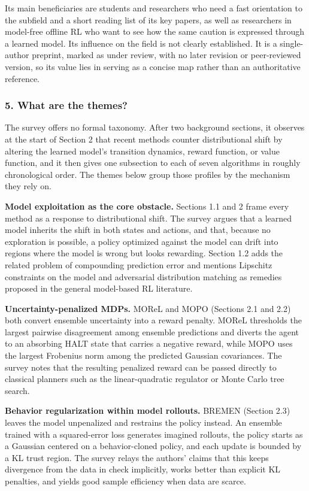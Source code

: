 \documentclass[11pt]{article}
\newcommand{\question}[1]{\subsubsection*{#1}}
\begin{document}
Its main beneficiaries are students and researchers who need a fast orientation to the subfield and a short reading list of its key papers, as well as researchers in model-free offline RL who want to see how the same caution is expressed through a learned model. Its influence on the field is not clearly established. It is a single-author preprint, marked as under review, with no later revision or peer-reviewed version, so its value lies in serving as a concise map rather than an authoritative reference.

\question{5. What are the themes?}

The survey offers no formal taxonomy. After two background sections, it observes at the start of Section 2 that recent methods counter distributional shift by altering the learned model's transition dynamics, reward function, or value function, and it then gives one subsection to each of seven algorithms in roughly chronological order. The themes below group those profiles by the mechanism they rely on.

\textbf{Model exploitation as the core obstacle.} Sections 1.1 and 2 frame every method as a response to distributional shift. The survey argues that a learned model inherits the shift in both states and actions, and that, because no exploration is possible, a policy optimized against the model can drift into regions where the model is wrong but looks rewarding. Section 1.2 adds the related problem of compounding prediction error and mentions Lipschitz constraints on the model and adversarial distribution matching as remedies proposed in the general model-based RL literature.

\textbf{Uncertainty-penalized MDPs.} MOReL and MOPO (Sections 2.1 and 2.2) both convert ensemble uncertainty into a reward penalty. MOReL thresholds the largest pairwise disagreement among ensemble predictions and diverts the agent to an absorbing HALT state that carries a negative reward, while MOPO uses the largest Frobenius norm among the predicted Gaussian covariances. The survey notes that the resulting penalized reward can be passed directly to classical planners such as the linear-quadratic regulator or Monte Carlo tree search.

\textbf{Behavior regularization within model rollouts.} BREMEN (Section 2.3) leaves the model unpenalized and restrains the policy instead. An ensemble trained with a squared-error loss generates imagined rollouts, the policy starts as a Gaussian centered on a behavior-cloned policy, and each update is bounded by a KL trust region. The survey relays the authors' claims that this keeps divergence from the data in check implicitly, works better than explicit KL penalties, and yields good sample efficiency when data are scarce.
\end{document}
